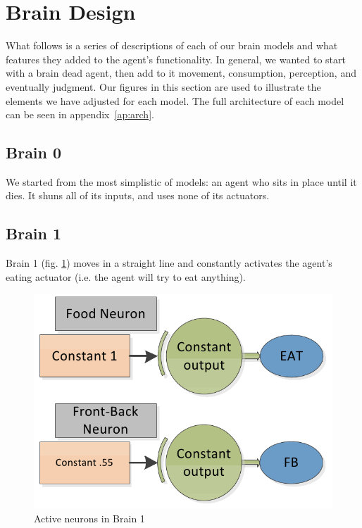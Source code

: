 \section{Brain Design} \label{sec:brain}
What follows is a series of descriptions of each of our brain models and what
features they added to the agent's functionality. In general, we wanted to 
start with a brain dead agent, then add to it movement, consumption, 
perception, and eventually judgment. Our figures in this section are used to 
illustrate the elements we have adjusted for each model. The full 
architecture of each model can be seen in appendix~\ref{ap:arch}.

\subsection{Brain 0}
We started from the most simplistic of models: an agent who sits in place until
it dies. It shuns all of its inputs, and uses none of its actuators.

\subsection{Brain 1}

Brain 1 (fig. \ref{fig:brain1}) moves in a straight line and constantly 
activates the agent's eating actuator (i.e. the agent will try to eat anything).

\begin{figure}
\begin{center}
  \includegraphics[scale=.3]{img/brain1.png}
  \caption{Active neurons in Brain 1}
  \label{fig:brain1}
\end{center}
\end{figure}

